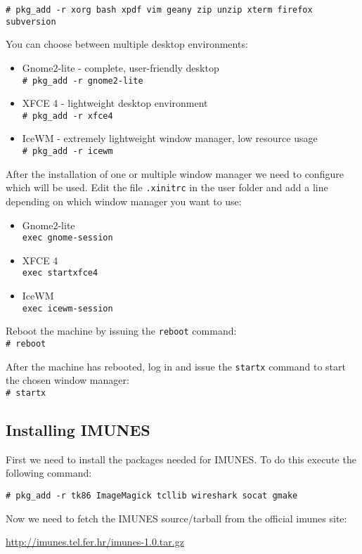 \texttt{\# pkg\_add -r xorg bash xpdf vim geany zip unzip xterm firefox subversion}

You can choose between multiple desktop environments:
\begin{itemize}
\item Gnome2-lite - complete, user-friendly desktop\\
\texttt{\# pkg\_add -r gnome2-lite}
\item XFCE 4 - lightweight desktop environment\\
\texttt{\# pkg\_add -r xfce4}
\item IceWM - extremely lightweight window manager, low resource usage\\
\texttt{\# pkg\_add -r icewm}
\end{itemize}

After the installation of one or multiple window manager we need to configure
which will be used. Edit the file \texttt{.xinitrc} in the user folder and add a line
depending on which window manager you want to use:
\begin{itemize}
\item Gnome2-lite\\
\texttt{exec gnome-session}
\item XFCE 4\\
\texttt{exec startxfce4}
\item IceWM\\
\texttt{exec icewm-session}
\end{itemize}

Reboot the machine by issuing the \texttt{reboot} command:\\
\texttt{\# reboot}

After the machine has rebooted, log in and issue the \texttt{startx} command to
start the chosen window manager:\\
\texttt{\# startx}

\subsection{Installing IMUNES}

First we need to install the packages needed for IMUNES. To do this execute the
following command:

\texttt{\# pkg\_add -r tk86 ImageMagick tcllib wireshark socat gmake}

Now we need to fetch the IMUNES source/tarball from the official imunes site:

\begin{center}
\url{http://imunes.tel.fer.hr/imunes-1.0.tar.gz}
\end{center}

